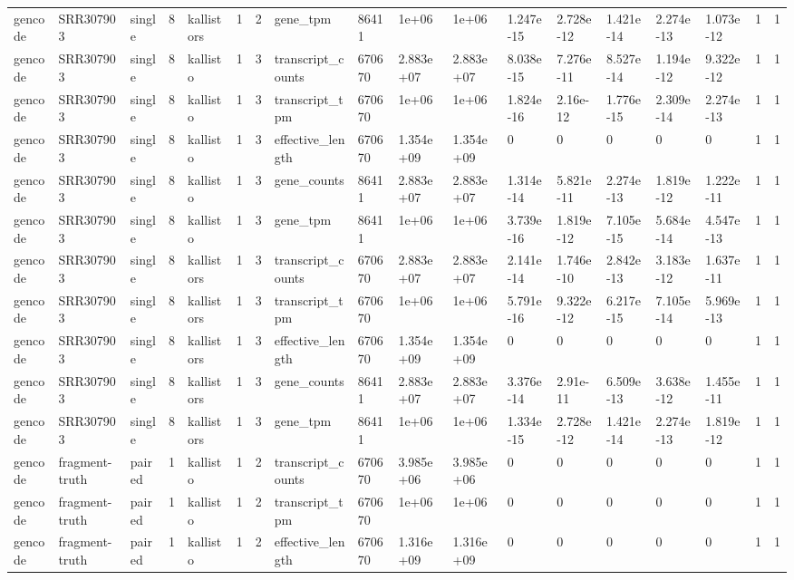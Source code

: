 \begin{tabular}{llllllllllllllllll}
gencode & SRR307903 & single & 8 & kallistors & 1 & 2 & gene\_tpm & 86411 & 1e+06 & 1e+06 & 1.247e-15 & 2.728e-12 & 1.421e-14 & 2.274e-13 & 1.073e-12 & 1 & 1 \\
gencode & SRR307903 & single & 8 & kallisto & 1 & 3 & transcript\_counts & 670670 & 2.883e+07 & 2.883e+07 & 8.038e-15 & 7.276e-11 & 8.527e-14 & 1.194e-12 & 9.322e-12 & 1 & 1 \\
gencode & SRR307903 & single & 8 & kallisto & 1 & 3 & transcript\_tpm & 670670 & 1e+06 & 1e+06 & 1.824e-16 & 2.16e-12 & 1.776e-15 & 2.309e-14 & 2.274e-13 & 1 & 1 \\
gencode & SRR307903 & single & 8 & kallisto & 1 & 3 & effective\_length & 670670 & 1.354e+09 & 1.354e+09 & 0 & 0 & 0 & 0 & 0 & 1 & 1 \\
gencode & SRR307903 & single & 8 & kallisto & 1 & 3 & gene\_counts & 86411 & 2.883e+07 & 2.883e+07 & 1.314e-14 & 5.821e-11 & 2.274e-13 & 1.819e-12 & 1.222e-11 & 1 & 1 \\
gencode & SRR307903 & single & 8 & kallisto & 1 & 3 & gene\_tpm & 86411 & 1e+06 & 1e+06 & 3.739e-16 & 1.819e-12 & 7.105e-15 & 5.684e-14 & 4.547e-13 & 1 & 1 \\
gencode & SRR307903 & single & 8 & kallistors & 1 & 3 & transcript\_counts & 670670 & 2.883e+07 & 2.883e+07 & 2.141e-14 & 1.746e-10 & 2.842e-13 & 3.183e-12 & 1.637e-11 & 1 & 1 \\
gencode & SRR307903 & single & 8 & kallistors & 1 & 3 & transcript\_tpm & 670670 & 1e+06 & 1e+06 & 5.791e-16 & 9.322e-12 & 6.217e-15 & 7.105e-14 & 5.969e-13 & 1 & 1 \\
gencode & SRR307903 & single & 8 & kallistors & 1 & 3 & effective\_length & 670670 & 1.354e+09 & 1.354e+09 & 0 & 0 & 0 & 0 & 0 & 1 & 1 \\
gencode & SRR307903 & single & 8 & kallistors & 1 & 3 & gene\_counts & 86411 & 2.883e+07 & 2.883e+07 & 3.376e-14 & 2.91e-11 & 6.509e-13 & 3.638e-12 & 1.455e-11 & 1 & 1 \\
gencode & SRR307903 & single & 8 & kallistors & 1 & 3 & gene\_tpm & 86411 & 1e+06 & 1e+06 & 1.334e-15 & 2.728e-12 & 1.421e-14 & 2.274e-13 & 1.819e-12 & 1 & 1 \\
gencode & fragment-truth & paired & 1 & kallisto & 1 & 2 & transcript\_counts & 670670 & 3.985e+06 & 3.985e+06 & 0 & 0 & 0 & 0 & 0 & 1 & 1 \\
gencode & fragment-truth & paired & 1 & kallisto & 1 & 2 & transcript\_tpm & 670670 & 1e+06 & 1e+06 & 0 & 0 & 0 & 0 & 0 & 1 & 1 \\
gencode & fragment-truth & paired & 1 & kallisto & 1 & 2 & effective\_length & 670670 & 1.316e+09 & 1.316e+09 & 0 & 0 & 0 & 0 & 0 & 1 & 1 \\

\end{tabular}
